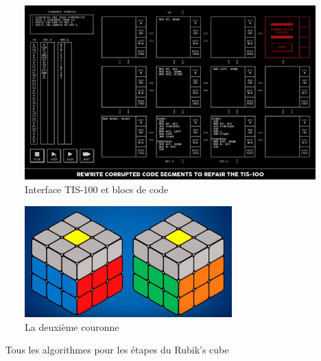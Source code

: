 \begin{figure}[!htb]
  \centering
  \includegraphics[width=150mm,scale=0.5]{images/tis-100.jpg}
  \caption{Interface TIS-100 et blocs de code}
  \label{fig:boat1}
\end{figure}

\begin{figure}[!htb]
  \centering
  \includegraphics[width=80mm,scale=0.5]{images/rubiks-cube4.PNG}
  \caption{La deuxième couronne}
  \label{fig:boat1}
\end{figure}

\newpage

 
\newpage
Tous les algorithmes pour les étapes du Rubik's cube

